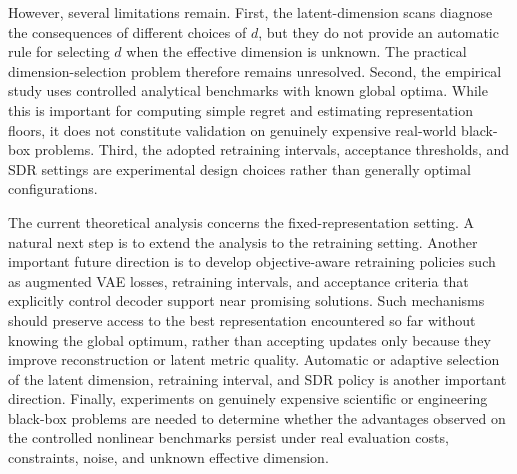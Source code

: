 \documentclass[pdflatex,sn-mathphys-num]{sn-jnl}%
\theoremstyle{thmstyleone}%
\theoremstyle{thmstyletwo}%
\theoremstyle{thmstylethree}%
\begin{document}
However, several limitations remain. First, the latent-dimension scans diagnose the consequences of different choices of $d$, but they do not provide an automatic rule for selecting $d$ when the effective dimension is unknown. The practical dimension-selection problem therefore remains unresolved. Second, the empirical study uses controlled analytical benchmarks with known global optima. While this is important for computing simple regret and estimating representation floors, it does not constitute validation on genuinely expensive real-world black-box problems. Third, the adopted retraining intervals, acceptance thresholds, and SDR settings are experimental design choices rather than generally optimal configurations.

The current theoretical analysis concerns the fixed-representation setting. A natural next step is to extend the analysis to the retraining setting. Another important future direction is to develop objective-aware retraining policies such as augmented VAE losses, retraining intervals, and acceptance criteria that explicitly control decoder support near promising solutions. Such mechanisms should preserve access to the best representation encountered so far without knowing the global optimum, rather than accepting updates only because they improve reconstruction or latent metric quality. Automatic or adaptive selection of the latent dimension, retraining interval, and SDR policy is another important direction. Finally, experiments on genuinely expensive scientific or engineering black-box problems are needed to determine whether the advantages observed on the controlled nonlinear benchmarks persist under real evaluation costs, constraints, noise, and unknown effective dimension.







\end{document}
